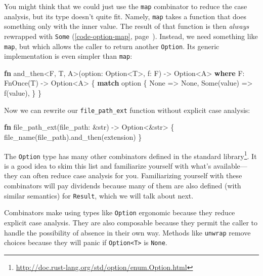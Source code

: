 \documentclass[a4paper,]{book}
\renewcommand*{\hyperref}[2][\ar]{%
  \def\ar{#2}%
  #2 (\autoref{#1}, page~\pageref{#1})}
\newenvironment{Shaded}{\begin{snugshade}}{\end{snugshade}}
\newcommand{\KeywordTok}[1]{\textcolor[rgb]{0.13,0.29,0.53}{\textbf{{#1}}}}
\newcommand{\DataTypeTok}[1]{\textcolor[rgb]{0.13,0.29,0.53}{{#1}}}
\newcommand{\ConstantTok}[1]{\textcolor[rgb]{0.00,0.00,0.00}{{#1}}}
\newcommand{\BuiltInTok}[1]{{#1}}
\newcommand{\NormalTok}[1]{{#1}}
\renewcommand{\href}[2]{#2\footnote{\url{#1}}}
\begin{document}
You might think that we could just use the \texttt{map} combinator to
reduce the case analysis, but its type doesn't quite fit. Namely,
\texttt{map} takes a function that does something only with the inner
value. The result of that function is then \emph{always}
\hyperref[code-option-map]{rewrapped with \texttt{Some}}. Instead, we
need something like \texttt{map}, but which allows the caller to return
another \texttt{Option}. Its generic implementation is even simpler than
\texttt{map}:

\begin{Shaded}
\begin{Highlighting}[]
\KeywordTok{fn} \NormalTok{and_then<F, T, A>(option: }\DataTypeTok{Option}\NormalTok{<T>, f: F) -> }\DataTypeTok{Option}\NormalTok{<A>}
        \KeywordTok{where} \NormalTok{F: }\BuiltInTok{FnOnce}\NormalTok{(T) -> }\DataTypeTok{Option}\NormalTok{<A> \{}
    \KeywordTok{match} \NormalTok{option \{}
        \ConstantTok{None} \NormalTok{=> }\ConstantTok{None}\NormalTok{,}
        \ConstantTok{Some}\NormalTok{(value) => f(value),}
    \NormalTok{\}}
\NormalTok{\}}
\end{Highlighting}
\end{Shaded}

Now we can rewrite our \texttt{file\_path\_ext} function without
explicit case analysis:

\begin{Shaded}
\begin{Highlighting}[]
\KeywordTok{fn} \NormalTok{file_path_ext(file_path: &}\DataTypeTok{str}\NormalTok{) -> }\DataTypeTok{Option}\NormalTok{<&}\DataTypeTok{str}\NormalTok{> \{}
    \NormalTok{file_name(file_path).and_then(extension)}
\NormalTok{\}}
\end{Highlighting}
\end{Shaded}

The \texttt{Option} type has many other combinators
\href{http://doc.rust-lang.org/std/option/enum.Option.html}{defined in
the standard library}. It is a good idea to skim this list and
familiarize yourself with what's available---they can often reduce case
analysis for you. Familiarizing yourself with these combinators will pay
dividends because many of them are also defined (with similar semantics)
for \texttt{Result}, which we will talk about next.

Combinators make using types like \texttt{Option} ergonomic because they
reduce explicit case analysis. They are also composable because they
permit the caller to handle the possibility of absence in their own way.
Methods like \texttt{unwrap} remove choices because they will panic if
\texttt{Option\textless{}T\textgreater{}} is \texttt{None}.
\end{document}
